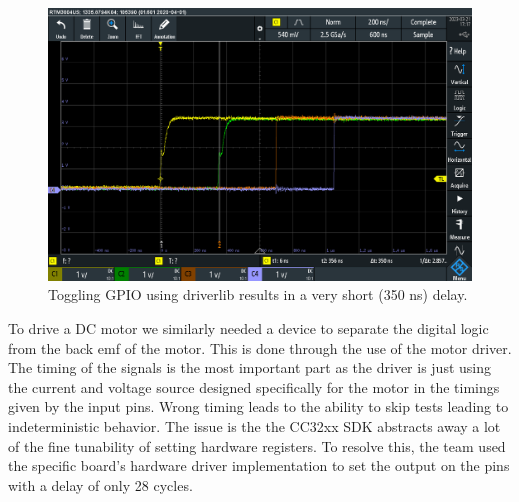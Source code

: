 \begin{figure}[H]
    \centering
    \label{fig:gpio_toggle_driverlib}
    \includegraphics[width=\linewidth]{images/gpio_toggle_driverlib.jpg}
    \caption{Toggling GPIO using driverlib results in a very short (350 ns) delay.}
\end{figure}
To drive a DC motor we similarly needed a device to separate the digital logic from the back emf of the motor. This is done through the use of the motor driver. The timing of the signals is the most important part as the driver is just using the current and voltage source designed specifically for the motor in the timings given by the input pins. Wrong timing leads to the ability to skip tests leading to indeterministic behavior. The issue is the the CC32xx SDK abstracts away a lot of the fine tunability of setting hardware registers. To resolve this, the team used the specific board's hardware driver implementation to set the output on the pins with a delay of only 28 cycles.

